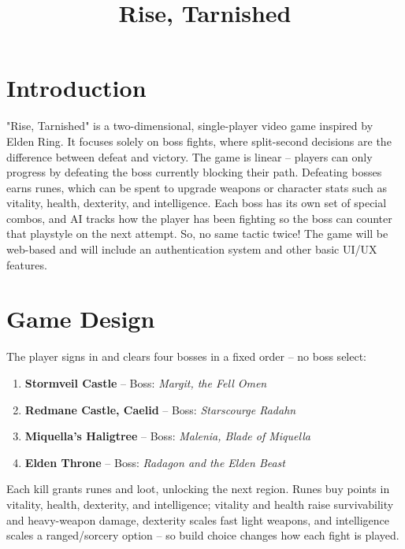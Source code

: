 \documentclass[conference]{IEEEtran}
\begin{document}
\title{Rise, Tarnished}

\author{
}

\maketitle

\section{Introduction}
"Rise, Tarnished" is a two-dimensional, single-player video game inspired by Elden Ring. It focuses solely on boss fights, where split-second decisions are the difference between defeat and victory. The game is linear -- players can only progress by defeating the boss currently blocking their path. Defeating bosses earns runes, which can be spent to upgrade weapons or character stats such as vitality, health, dexterity, and intelligence. Each boss has its own set of special combos, and AI tracks how the player has been fighting so the boss can counter that playstyle on the next attempt. So, no same tactic twice! The game will be web-based and will include an authentication system and other basic UI/UX features.

\section{Game Design}
The player signs in and clears four bosses in a fixed order -- no boss select:
\begin{enumerate}
\item \textbf{Stormveil Castle} -- Boss: \emph{Margit, the Fell Omen}
\item \textbf{Redmane Castle, Caelid} -- Boss: \emph{Starscourge Radahn}
\item \textbf{Miquella's Haligtree} -- Boss: \emph{Malenia, Blade of Miquella}
\item \textbf{Elden Throne} -- Boss: \emph{Radagon and the Elden Beast}
\end{enumerate}
Each kill grants runes and loot, unlocking the next region. Runes buy points in vitality, health, dexterity, and intelligence; vitality and health raise survivability and heavy-weapon damage, dexterity scales fast light weapons, and intelligence scales a ranged/sorcery option -- so build choice changes how each fight is played.
\end{document}
